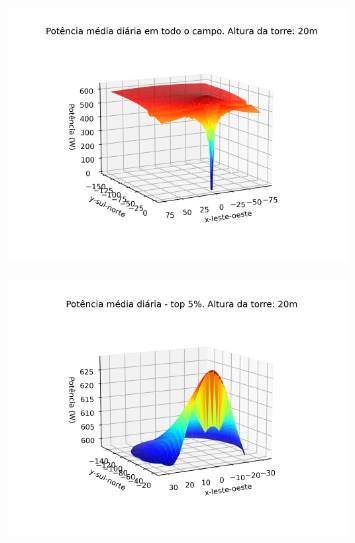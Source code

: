 \documentclass[12pt,notheorems,hyperref={pdfauthor= Rafael Nardi}]{beamer}
\begin{document}
\begin{frame}%
	\begin{figure}[htpb]
		\centering
		\includegraphics[width=0.8\textwidth]{../../plots/tower_shadow_correction/square_grid_along_day_20mfull_grid.png}
		\label{fig:heliost_field_average_20m}
	\end{figure}
\end{frame}

\begin{frame}%
	\begin{figure}[htpb]
		\centering
		\includegraphics[width=0.8\textwidth]{../../plots/tower_shadow_correction/square_grid_along_day_20mtop_5_most_powerfull.png}
		\label{fig:heliost_field_average_20m_top5}
	\end{figure}
\end{frame}
\end{document}
